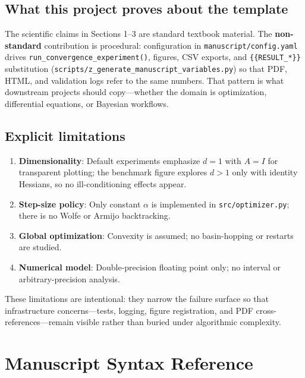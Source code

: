 \documentclass[
]{article}
\providecommand{\tightlist}{%
  \setlength{\itemsep}{0pt}\setlength{\parskip}{0pt}}
\begin{document}
\subsection{What this project proves about the
template}\label{what-this-project-proves-about-the-template}

The scientific claims in Sections 1--3 are standard textbook material.
The \textbf{non-standard} contribution is procedural: configuration in
\texttt{manuscript/config.yaml} drives
\texttt{run\_convergence\_experiment()}, figures, CSV exports, and
\texttt{\{\{RESULT\_*\}\}} substitution
(\texttt{scripts/z\_generate\_manuscript\_variables.py}) so that PDF,
HTML, and validation logs refer to the same numbers. That pattern is
what downstream projects should copy---whether the domain is
optimization, differential equations, or Bayesian workflows.

\subsection{Explicit limitations}\label{explicit-limitations}

\begin{enumerate}
\def\labelenumi{\arabic{enumi}.}
\tightlist
\item
  \textbf{Dimensionality}: Default experiments emphasize \(d = 1\) with
  \(A = I\) for transparent plotting; the benchmark figure explores
  \(d > 1\) only with identity Hessians, so no ill-conditioning effects
  appear.
\item
  \textbf{Step-size policy}: Only constant \(\alpha\) is implemented in
  \texttt{src/optimizer.py}; there is no Wolfe or Armijo backtracking.
\item
  \textbf{Global optimization}: Convexity is assumed; no basin-hopping
  or restarts are studied.
\item
  \textbf{Numerical model}: Double-precision floating point only; no
  interval or arbitrary-precision analysis.
\end{enumerate}

These limitations are intentional: they narrow the failure surface so
that infrastructure concerns---tests, logging, figure registration, and
PDF cross-references---remain visible rather than buried under
algorithmic complexity.

\newpage

\section{Manuscript Syntax Reference}\label{manuscript-syntax-reference}
\end{document}
